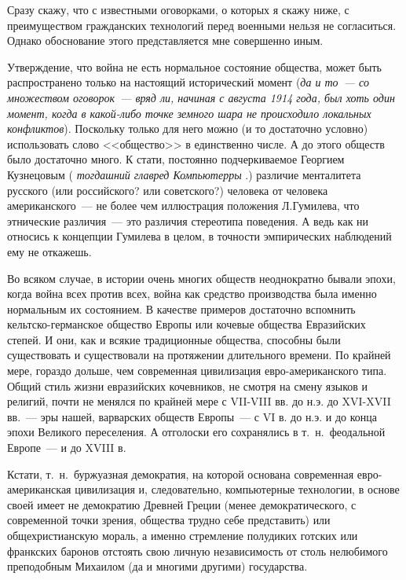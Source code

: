 Сразу скажу, что с известными оговорками, о которых я скажу ниже, с преимуществом гражданских технологий перед военными нельзя не согласиться. Однако обоснование этого представляется мне совершенно иным. 

Утверждение, что война не есть нормальное состояние общества, может быть распространено только на настоящий исторический момент (\textit{да и то~--- со множеством оговорок~--- вряд ли, начиная с августа 1914 года, был хоть один момент, когда в какой-либо точке земного шара не происходило локальных конфликтов}). Поскольку только для него можно (и то достаточно условно) использовать слово <<общество>> в единственно числе. А до этого обществ было достаточно много. К стати, постоянно подчеркиваемое Георгием Кузнецовым (
\textit{тогдашний главред Компьютерры}
.) различие менталитета русского (или российского? или советского?) человека от человека американского~--- не более чем иллюстрация положения Л.Гумилева, что этнические различия~--- это различия стереотипа поведения. А ведь как ни относись к концепции Гумилева в целом, в точности эмпирических наблюдений ему не откажешь. 

Во всяком случае, в истории очень многих обществ неоднократно бывали эпохи, когда война всех против всех, война как средство производства была именно нормальным их состоянием. В качестве примеров достаточно вспомнить кельтско-германское общество Европы или кочевые общества Евразийских степей. И они, как и всякие традиционные общества, способны были существовать и существовали на протяжении длительного времени. По крайней мере, гораздо дольше, чем современная цивилизация евро-американского типа. Общий стиль жизни евразийских кочевников, не смотря на смену языков и религий, почти не менялся по крайней мере с VII-VIII вв. до н.э. до XVI-XVII вв.~--- эры нашей, варварских обществ Европы~--- с VI в. до н.э. и до конца эпохи Великого переселения. А отголоски его сохранялись в т.~н.~феодальной Европе~--- и до XVIII в. 

Кстати, т.~н.~буржуазная демократия, на которой основана современная евро-американская цивилизация и, следовательно, компьютерные технологии, в основе своей имеет не демократию Древней Греции (менее демократического, с современной точки зрения, общества трудно себе представить) или общехристианскую мораль, а именно стремление полудиких готских или франкских баронов отстоять свою личную независимость от столь нелюбимого преподобным Михаилом (да и многими другими) государства. 

